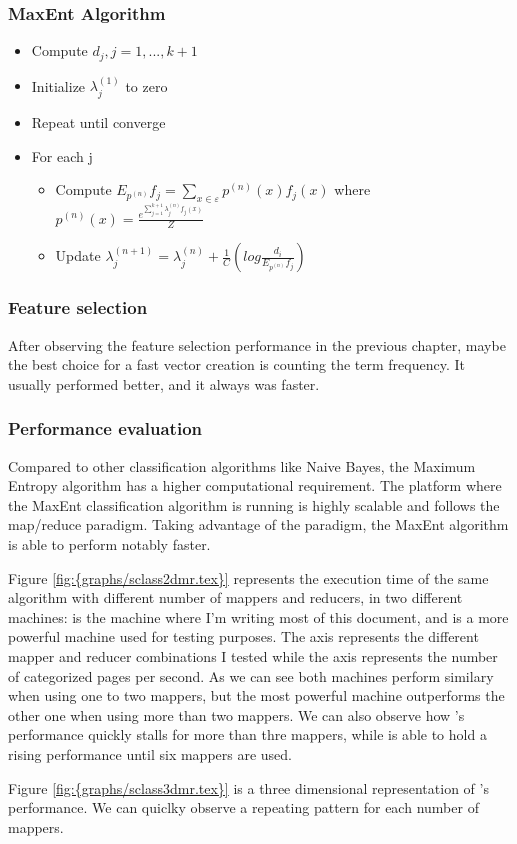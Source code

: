 \subsubsection{MaxEnt Algorithm}


\begin{itemize}
\item Compute $d_j, j=1,...,k+1$
\item Initialize $\lambda_j^{(1)}$ to zero
\item Repeat until converge
\item For each j 
  \begin{itemize}
  \item Compute $E_{p^{(n)}} f_j = \sum\limits_{x \in \varepsilon} p^{(n)} (x)f_j(x)$
    where $p^{(n)}(x) = \frac{e^{\sum\limits_{j=1}^{k+1}\lambda_j^{(n)}f_j(x)}}{Z}$ 
  \item Update $\lambda_j^{(n+1)} = \lambda_j^{(n)} + \frac{1}{C}(log\frac{d_i}{E_{{p^{(n)}}}f_j})$
  \end{itemize}
\end{itemize}

  

\subsubsection{Feature selection}
After observing the feature selection performance in the previous chapter, maybe the best choice for a fast vector creation is counting the term frequency. It usually performed better, and it always
was faster.


\subsubsection{Performance evaluation}
Compared to other classification algorithms like Naive Bayes, the Maximum Entropy algorithm has a higher computational requirement. 
The platform where the MaxEnt classification algorithm is running is highly scalable and follows the map/reduce paradigm. Taking advantage of the paradigm, the MaxEnt algorithm
is able to perform notably faster.



Figure \ref{fig:{graphs/sclass2dmr.tex}} represents the execution time of the same algorithm with different number of mappers and reducers, in two different machines:  
is the machine where I'm writing most of this document, and  is a more powerful machine used for testing purposes. The  axis represents the 
different mapper and reducer combinations I tested while the  axis represents the number of categorized pages per second.
As we can see both machines perform similary when using one to two mappers, but the most powerful machine outperforms the other one when using more than two mappers. We can also observe how 's performance
quickly stalls for more than thre mappers, while  is able to hold a rising performance until six mappers are used.

Figure \ref{fig:{graphs/sclass3dmr.tex}} is a three dimensional representation of 's performance. We can quiclky observe a repeating pattern for each number of mappers.


